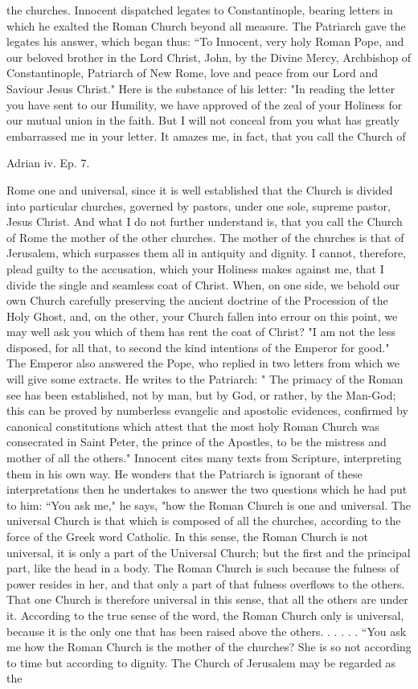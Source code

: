 the churches. Innocent dispatched legates to Constantinople, bearing letters in which he exalted the Roman Church beyond all measure. The Patriarch gave the legates his answer, which began thus: “To Innocent, very holy Roman Pope, and our beloved brother in the Lord Christ, John, by the Divine Mercy, Archbishop of Constantinople, Patriarch of New Rome, love and peace from our Lord and Saviour Jesus Christ." Here is the substance of his letter: "In reading the letter you have sent to our Humility, we have approved of the zeal of your Holiness for our mutual union in the faith. But I will not conceal from you what has greatly embarrassed me in your letter. It amazes me, in fact, that you call the Church of

Adrian iv. Ep. 7.

Rome one and universal, since it is well established that the Church is divided into particular churches, governed by pastors, under one sole, supreme pastor, Jesus Christ. And what I do not further understand is, that you call the Church of Rome the mother of the other churches. The mother of the churches is that of Jerusalem, which surpasses them all in antiquity and dignity. I cannot, therefore, plead guilty to the accusation, which your Holiness makes against me, that I divide the single and seamless coat of Christ. When, on one side, we behold our own Church carefully preserving the ancient doctrine of the Procession of the Holy Ghost, and, on the other, your Church fallen into errour on this point, we may well ask you which of them has rent the coat of Christ? "I am not the less disposed, for all that, to second the kind intentions of the Emperor for good." The Emperor also answered the Pope, who replied in two letters from which we will give some extracts. He writes to the Patriarch: " The primacy of the Roman see has been established, not by man, but by God, or rather, by the Man-God; this can be proved by numberless evangelic and apostolic evidences, confirmed by canonical constitutions which attest that the most holy Roman Church was consecrated in Saint Peter, the prince of the Apostles, to be the mistress and mother of all the others." Innocent cites many texts from Scripture, interpreting them in his own way. He wonders that the Patriarch is ignorant of these interpretations then he undertakes to answer the two questions which he had put to him: “You ask me," he says, "how the Roman Church is one and universal. The universal Church is that which is composed of all the churches, according to the force of the Greek word Catholic. In this sense, the Roman Church is not universal, it is only a part of the Universal Church; but the first and the principal part, like the head in a body. The Roman Church is such because the fulness of power resides in her, and that only a part of that fulness overflows to the others. That one Church is therefore universal in this sense, that all the others are under it. According to the true sense of the word, the Roman Church only is universal, because it is the only one that has been raised above the others. . . . . . “You ask me how the Roman Church is the mother of the churches? She is so not according to time but according to dignity. The Church of Jerusalem may be regarded as the 